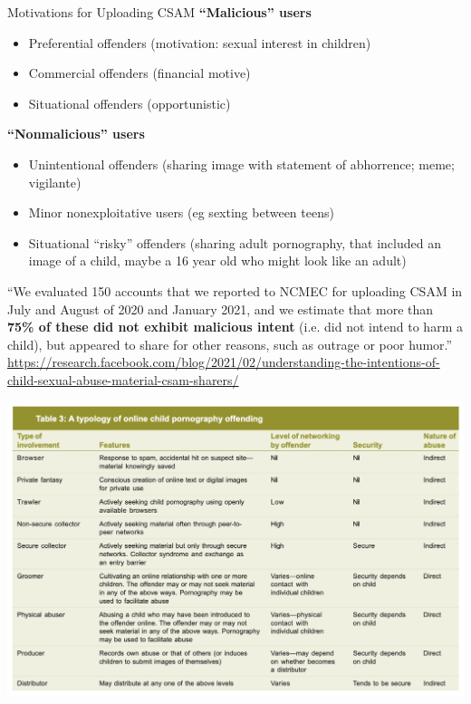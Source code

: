 \documentclass[nobackground,dvipsnames,table,aspectratio=169]{beamer}
\begin{document}
\begin{frame}{Motivations for Uploading CSAM}
    \textbf{“Malicious” users}
    \begin{itemize}
        \small
        \item Preferential offenders (motivation: sexual interest in children)
        \item Commercial offenders (financial motive)
        \item Situational offenders (opportunistic)
    \end{itemize}
    \textbf{“Nonmalicious” users}
    \begin{itemize}
        \small
        \item Unintentional offenders (sharing image with statement of abhorrence; meme; vigilante)
        \item Minor nonexploitative users (eg sexting between teens)
        \item Situational “risky” offenders  (sharing adult pornography, that included an image of a child, maybe a 16 year old who might look like an adult)
    \end{itemize}
    \small
    “We evaluated 150 accounts that we reported to NCMEC for uploading CSAM in July and August of 2020 and January 2021, and we estimate that more than \textbf{75\% of these did not exhibit malicious intent} (i.e. did not intend to harm a child), but appeared to share for other reasons, such as outrage or poor humor.”
    \tiny
    \url{https://research.facebook.com/blog/2021/02/understanding-the-intentions-of-child-sexual-abuse-material-csam-sharers/}
\end{frame}

\begin{frame}{}
    \centering
    \includegraphics[width=\textwidth]{typology-of-ocse-offenders}
\end{frame}
\end{document}
